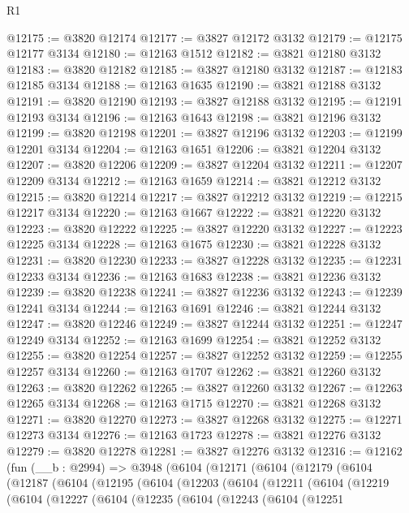\begin{lexlean}{R1}
\begin{coremodule}
@12175 := @3820 @12174
@12177 := @3827 @12172 @3132
@12179 := @12175 @12177 @3134
@12180 := @12163 @1512
@12182 := @3821 @12180 @3132
@12183 := @3820 @12182
@12185 := @3827 @12180 @3132
@12187 := @12183 @12185 @3134
@12188 := @12163 @1635
@12190 := @3821 @12188 @3132
@12191 := @3820 @12190
@12193 := @3827 @12188 @3132
@12195 := @12191 @12193 @3134
@12196 := @12163 @1643
@12198 := @3821 @12196 @3132
@12199 := @3820 @12198
@12201 := @3827 @12196 @3132
@12203 := @12199 @12201 @3134
@12204 := @12163 @1651
@12206 := @3821 @12204 @3132
@12207 := @3820 @12206
@12209 := @3827 @12204 @3132
@12211 := @12207 @12209 @3134
@12212 := @12163 @1659
@12214 := @3821 @12212 @3132
@12215 := @3820 @12214
@12217 := @3827 @12212 @3132
@12219 := @12215 @12217 @3134
@12220 := @12163 @1667
@12222 := @3821 @12220 @3132
@12223 := @3820 @12222
@12225 := @3827 @12220 @3132
@12227 := @12223 @12225 @3134
@12228 := @12163 @1675
@12230 := @3821 @12228 @3132
@12231 := @3820 @12230
@12233 := @3827 @12228 @3132
@12235 := @12231 @12233 @3134
@12236 := @12163 @1683
@12238 := @3821 @12236 @3132
@12239 := @3820 @12238
@12241 := @3827 @12236 @3132
@12243 := @12239 @12241 @3134
@12244 := @12163 @1691
@12246 := @3821 @12244 @3132
@12247 := @3820 @12246
@12249 := @3827 @12244 @3132
@12251 := @12247 @12249 @3134
@12252 := @12163 @1699
@12254 := @3821 @12252 @3132
@12255 := @3820 @12254
@12257 := @3827 @12252 @3132
@12259 := @12255 @12257 @3134
@12260 := @12163 @1707
@12262 := @3821 @12260 @3132
@12263 := @3820 @12262
@12265 := @3827 @12260 @3132
@12267 := @12263 @12265 @3134
@12268 := @12163 @1715
@12270 := @3821 @12268 @3132
@12271 := @3820 @12270
@12273 := @3827 @12268 @3132
@12275 := @12271 @12273 @3134
@12276 := @12163 @1723
@12278 := @3821 @12276 @3132
@12279 := @3820 @12278
@12281 := @3827 @12276 @3132
@12316 := @12162
    (fun (__b : @2994) =>
    @3948
      (@6104
        (@12171
          (@6104
            (@12179
              (@6104
                (@12187
                  (@6104
                    (@12195
                      (@6104
                        (@12203
                          (@6104
                            (@12211
                              (@6104
                                (@12219
                                  (@6104
                                    (@12227
                                      (@6104
                                        (@12235
                                          (@6104
                                            (@12243
                                              (@6104
                                                (@12251

\end{coremodule}
\end{lexlean}
